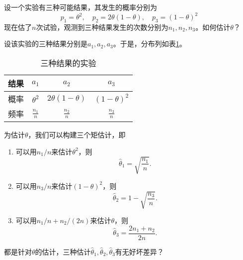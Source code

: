 \begin{example}
    设一个实验有三种可能结果，其发生的概率分别为$$p_{1}=\theta^{2},\quad p_{2}=2\theta(1-\theta) ,\quad p_{3}=(1-\theta)^{2}$$
    现在估了$n$次试验，观测到三种结果发生的次数分别为$n_{1},n_{2},n_{3}$。如何估计$\theta$？
\end{example}
\begin{solution}
    设该实验的三种结果分别是$a_1,a_2,a_3$。于是，分布列如表\ref{tab:lecture18_1}。
    \begin{table}[ht]
        \centering
        \caption{三种结果的实验}\label{tab:lecture18_1}
    \begin{tabular}{cccc}
    \toprule
    结果 & $a_{1}$ & $a_{2}$ & $a_{3}$\\
    \midrule
    概率 &  $\theta^{2}$&$2\theta(1-\theta)$  &$(1-\theta)^{2}$ \\
    \midrule
    频率 &  $\frac{n_{1}}{n}$& $\frac{n_{2}}{n}$ & $\frac{n_{3}}{n}$\\
    \bottomrule
    \end{tabular}
    \end{table}
为估计$\theta$，我们可以构建三个矩估计，即
\begin{enumerate}
    \item 可以用$n_1/n$来估计$\theta^2$，则
    $$\hat{\theta}_1 = \sqrt{\frac{n_1}{n}}.$$
    \item 可以用$n_3/n$来估计$(1-\theta)^2$，则
    $$\hat{\theta}_2 = 1 - \sqrt{\frac{n_3}{n}}.$$
   \item 可以用$n_1/n + n_2/(2n)$来估计$\theta$，则
    $$\hat{\theta}_3 = \frac{2n_1 + n_2}{2n}.$$
\end{enumerate}
\end{solution}
\begin{problem}
    都是针对$\theta$的估计，三种估计$\hat{\theta}_1,\hat{\theta}_2,\hat{\theta}_3$有无好坏差异？
\end{problem}
